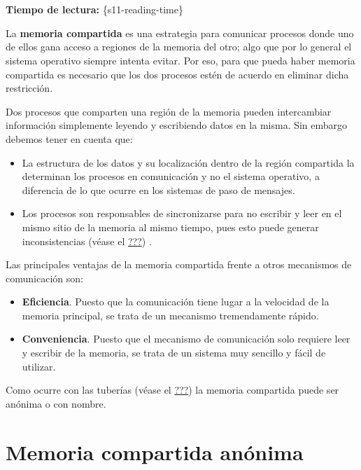 \section{}

\textbf{Tiempo de lectura:} \{s11-reading-time\}

La \textbf{memoria compartida}{} es una estrategia para comunicar
procesos donde uno de ellos gana acceso a regiones de la memoria del
otro; algo que por lo general el sistema operativo siempre intenta
evitar. Por eso, para que pueda haber memoria compartida es necesario
que los dos procesos estén de acuerdo en eliminar dicha restricción.

Dos procesos que comparten una región de la memoria pueden intercambiar
información simplemente leyendo y escribiendo datos en la misma. Sin
embargo debemos tener en cuenta que:

\begin{itemize}
\item
  La estructura de los datos y su localización dentro de la región
  compartida la determinan los procesos en comunicación y no el sistema
  operativo, a diferencia de lo que ocurre en los sistemas de paso de
  mensajes.
\item
  Los procesos son responsables de sincronizarse para no escribir y leer
  en el mismo sitio de la memoria al mismo tiempo, pues esto puede
  generar inconsistencias (véase el \hyperref[sincronizaciuxf3n]{???}) .
\end{itemize}

Las principales ventajas de la memoria compartida frente a otros
mecanismos de comunicación son:

\begin{itemize}
\item
  \textbf{Eficiencia}. Puesto que la comunicación tiene lugar a la
  velocidad de la memoria principal, se trata de un mecanismo
  tremendamente rápido.
\item
  \textbf{Conveniencia}. Puesto que el mecanismo de comunicación solo
  requiere leer y escribir de la memoria, se trata de un sistema muy
  sencillo y fácil de utilizar.
\end{itemize}

Como ocurre con las tuberías (véase el \hyperref[_tuberuxedas]{???}) la
memoria compartida puede ser anónima o con nombre.

\section{Memoria compartida
anónima}\label{_memoria_compartida_anuxf3nima}

